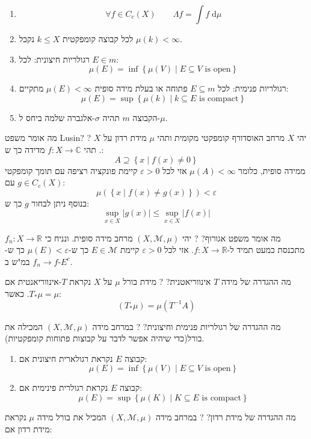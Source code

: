 \documentclass{tstextbook}
\begin{document}
\begin{enumerate}
  \item $$\forall f \in C_{c}(X)\qquad \Lambda f=\int f \;\mathrm{d} \mu $$


  \item לכל קבוצה קומפקטית \(k\leq X\)  נקבל \(\mu(k)< \infty\). 


  \item רגולריות חיצונית: לכל \(E \in m\): 
$$\mu(E)=\inf \left\{  \mu(V) \mid E\subseteq V \text{ is open} \right\}$$


  \item רגולריות פנימית: לכל \(E \subseteq m\) פתוחה או בעלת מידה סופית \(\mu(E)<\infty\) מתקיים: 
$$\mu(E)= \sup \left\{  \mu(k)\mid k\subseteq E\text{ is compact}  \right\}$$


  \item הקבוצה \(m\) תהיה \(\sigma\)-אלגברה  שלמה ביחס ל-\(\mu\). 


\end{enumerate}
מה אומר משפט Lusin?
?
יהי \(X\) מרחב האוסדורף קומפקטי מקומית ותהי \(\mu\) מידת רדון על \(X\). תהי \(f:X\to \mathbb{C}\) מדידה כך ש:
$$A\supseteq\left\{  x\mid f(x)\neq 0  \right\}$$
ממידה סופית, כלומר \(\mu(A)<\infty\) אזי לכל \(\varepsilon> 0\) קיימת פונקציה רציפה עם תומך קומפקטי \(g \in C_{c}(X)\) עם:
$$\mu\left( \left\{  x\mid f(x)\neq g(x)  \right\} \right)< \varepsilon$$
בנוסף ניתן לבחור \(g\) כך ש:
$$\sup _{x \in X}\lvert g(x) \rvert \leq \sup _{x \in X} \lvert f(x) \rvert $$

מה אומר משפט אגורוף?
?
יהי \(\left( X,\mathcal{M},\mu \right)\) מרחב מידה סופית. ונניח כי \(f_{n}:X\to \mathbb{R}\) מתכנסת כמעט תמיד ל-\(f:X\to \mathbb{R}\). אזי לכל \(\varepsilon> 0\) קיימת \(E \in \mathcal{ M}\) כך ש-\(\mu(E)< \varepsilon\) כך ש-\(f_{n}\to f\) במ"ש ב-\(E^{c}\).

מה ההגדרה של מידה \(T\) אינווריאטנית?
?
מידת בורל \(\mu\) על \(X\) נקראת \(T\)-אינווריאנטית אם \(T_{*}\mu = \mu\). כאשר:
$$\left( T_{*}\mu \right)=\mu(T^{-1}A)$$

מה ההגדרה של רגולריות פנימית וחיצונית?
?
במרחב מידה \(\left( X,\mathcal{M},\mu \right)\) המכילה את בורל(כדי שיהיה אפשר לדבר על קבוצות פתוחות קומפקטיות).

\begin{enumerate}
  \item קבוצה \(E\) נקראת רגולארית חיצונית אם: 
$$\mu(E)=\inf \left\{  \mu(V)\mid E \subseteq V \text{ is open}  \right\}$$


  \item קבוצה \(E\) נקראת רגולרית פינימית אם: 
$$\mu(E)=\sup  \left\{  \mu(K)\mid K \subseteq E \text{ is compact}  \right\}$$


\end{enumerate}
מה ההגדרה של מידת רדון?
?
במרחב מידה \(\left( X,\mathcal{M},\mu \right)\) המכיל את בורל מידה \(\mu\) נקראת מידת רדון אם:
\end{document}
